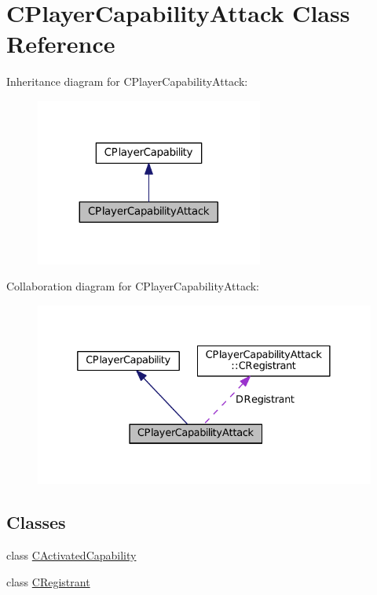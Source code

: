 \hypertarget{classCPlayerCapabilityAttack}{}\section{C\+Player\+Capability\+Attack Class Reference}
\label{classCPlayerCapabilityAttack}


Inheritance diagram for C\+Player\+Capability\+Attack\+:
\nopagebreak
\begin{figure}[H]
\begin{center}
\leavevmode
\includegraphics[width=212pt]{classCPlayerCapabilityAttack__inherit__graph}
\end{center}
\end{figure}


Collaboration diagram for C\+Player\+Capability\+Attack\+:
\nopagebreak
\begin{figure}[H]
\begin{center}
\leavevmode
\includegraphics[width=332pt]{classCPlayerCapabilityAttack__coll__graph}
\end{center}
\end{figure}
\subsection*{Classes}
\begin{DoxyCompactItemize}
\item 
class \hyperlink{classCPlayerCapabilityAttack_1_1CActivatedCapability}{C\+Activated\+Capability}
\item 
class \hyperlink{classCPlayerCapabilityAttack_1_1CRegistrant}{C\+Registrant}
\end{DoxyCompactItemize}
